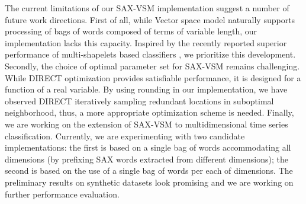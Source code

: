 \documentclass{llncs}
\begin{document}
The current limitations of our SAX-VSM implementation suggest a number of future work directions. 
First of all, while Vector space model naturally supports processing of bags of words composed 
of terms of variable length, our implementation lacks this capacity. 
Inspired by the recently reported superior performance of multi-shapelets based classifiers
\cite{bagnal}, we prioritize this development.
Secondly, the choice of optimal parameter set for SAX-VSM remains challenging.
While DIRECT optimization provides satisfiable performance, it is designed for a function of a real 
variable. By using rounding in our implementation, we have observed DIRECT iteratively sampling 
redundant locations in suboptimal neighborhood, thus, a more appropriate optimization scheme is
needed.
Finally, we are working on the extension of SAX-VSM to multidimensional time series classification.
Currently, we are experimenting with two candidate implementations: the first is based on a
single bag of words accommodating all dimensions (by prefixing SAX words extracted from
different dimensions); the second is based on the use of a single bag of words per each of
dimensions. The preliminary results on synthetic datasets look promising and we are
working on further performance evaluation.
%
%
\enlargethispage{0.5cm} 
\end{document}

